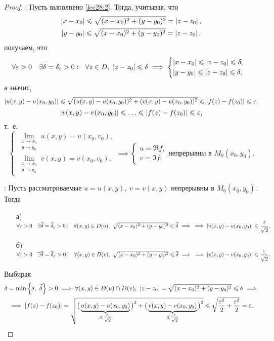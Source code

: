 \documentclass[../../main.tex]{subfiles}
\begin{document}
\begin{proof}
	\;
	
	\nec: Пусть выполнено \eqref{lec28:2}. Тогда, учитывая, что
	\[\begin{gathered}
	\left|{x - x_0}\right| \leqslant \sqrt{(x - x_0)^2 + (y - y_0)^2} = \left|{z - z_0}\right|, \\
	\left|{y - y_0}\right| \leqslant \sqrt{(x - x_0)^2 + (y - y_0)^2} = \left|{z - z_0}\right|,
	\end{gathered}\]
	получаем, что
	\[
	\forall \varepsilon > 0 \quad \exists \delta = \delta_{\varepsilon} > 0 : \ \
	\forall z \in D,\ \left|{z - z_0}\right| \leqslant \delta \implies
	\begin{cases}
		\left|{x - x_0}\right| \leqslant \left|{z - z_0}\right| \leqslant \delta, \\
		\left|{y - y_0}\right| \leqslant \left|{z - z_0}\right| \leqslant \delta,
	\end{cases}
	\]
	а значит,
	\[
	\left|{u(x, y) - u(x_0, y_0)}\right| \leqslant
	\sqrt{(u(x, y) - u(x_0, y_0))^2 + (v(x, y) - v(x_0, y_0))^2}
	\leqslant \left|{f(z) - f(z_0)}\right| \leqslant \varepsilon,
	\]
	\[
	\left|{v(x, y) - v(x_0, y_0)}\right| \leqslant \ldots \leqslant \left|{f(z) - f(z_0)}\right| \leqslant \varepsilon,
	\]
	т.~е.
	\[
	\begin{cases}
		\lim\limits_{\substack{x \to x_0\\y \to y_0}} u(x, y) = u(x_0, v_0), \\
		\lim\limits_{\substack{x \to x_0\\y \to y_0}} v(x, y) = v(x_0, v_0),
	\end{cases}
	\implies
	\begin{cases}
		u = \Re f, \\
		v = \Im f,
	\end{cases}
	\text{непрерывны в }
	M_0(x_0, y_0).
	\]
	
	\suff: Пусть рассматриваемые $u = u(x, y),\ v = v(x, y)$
	непрерывны в $M_0(x_0, y_0)$. Тогда
	\begin{enumerate}
		\item[а)] $\forall \varepsilon > 0 \quad
		\exists \widetilde{\delta} = \widetilde{\delta}_{\varepsilon} > 0 : \ \
		\forall (x, y) \in D(u),\
		\sqrt{(x - x_0)^2 + (y - y_0)^2} \leqslant \widetilde{\delta}
		\implies \\ \implies
		\left|{u(x, y) - u(x_0, y_0)}\right| \leqslant \dfrac{\varepsilon}{\sqrt{2}}.$
		\item[б)] $\forall \eps > 0 \quad
		\exists \overline{\delta} = \overline{\delta}_{\eps} > 0 : \ \
		\forall (x, y) \in D(v),\
		\sqrt{(x - x_0)^2 + (y - y_0)^2} \le \overline{\delta}
		\implies \\ \implies
		\abs{v(x, y) - v(x_0, y_0)} \le \dfrac{\eps}{\sqrt{2}}.$
	\end{enumerate}
	Выбирая
	\[\begin{gathered}
	\delta = \min \left\{\overline{\delta},\ \widetilde{\delta}\right\} > 0
	\implies \forall (x, y) \in D(u) \cap D(v),\
	\left|{z - z_0}\right| =
	\sqrt{(x - x_0)^2 + (y - y_0)^2} \leqslant \delta
	\implies \\ \implies \left|{f(z) - f(z_0)}\right| = \sqrt{
	{\big(\underbrace{u(x, y) - u(x_0, y_0)}_{\leqslant \tfrac{\varepsilon}{\sqrt{2}}}\big)}^2
	+
	{\big(\underbrace{v(x, y) - v(x_0, y_0)}_{\leqslant \tfrac{\varepsilon}{\sqrt{2}}}\big)}^2
	} \leqslant \sqrt{\frac{\varepsilon^2}{2} + \frac{\varepsilon^2}{2}} = \varepsilon.\qedhere
	\end{gathered}\]
\end{proof}
\end{document}
